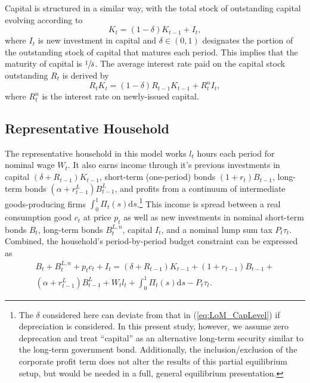 \documentclass[11pt,a4paper,margin=1.5in]{article}
\begin{document}
Capital is structured in a similar way, with the total stock of outstanding capital evolving according to
\begin{equation}
	K_t = (1-\delta)K_{t-1} + I_t,
	\label{eq:LoM_CapLevel}
\end{equation}
where $I_t$ is new investment in capital and $\delta \in (0,1)$ designates the portion of the outstanding stock of capital that matures each period.
This implies that the maturity of capital is $\sfrac{1}{\delta}$. 
The average interest rate paid on the capital stock outstanding $R_t$ is derived by
\begin{equation}
	R_tK_t = (1-\delta)R_{t-1}K_{t-1} + R^n_tI_t,
	\label{eq:LoM_CapReturn}
\end{equation}
where $R^n_t$ is the interest rate on newly-issued capital.

\subsection{Representative Household}
The representative household in this model works $l_t$ hours each period for nominal wage $W_t$.
It also earns income through it's previous investments in capital $(\delta + R_{t-1})K_{t-1}$, short-term (one-period) bonds $(1+r_t)B_{t-1}$, long-term bonds $(\alpha + r^L_{t-1})B^L_{t-1}$, and profits from a continuum of intermediate goods-producing firms $\int^1_0 \Pi_t(s) \mathrm{d}s$.\footnote{
	The $\delta$ considered here can deviate from that in (\ref{eq:LoM_CapLevel}) if depreciation is considered.
	In this present study, however, we assume zero deprecation and treat ``capital'' as an alternative long-term security similar to the long-term government bond.
	Additionally, the inclusion/exclusion of the corporate profit term does not alter the results of this partial equilibrium setup, but would be needed in a full, general equilibrium presentation.}
This income is spread between a real consumption good $c_t$ at price $p_t$ as well as new investments in nominal short-term bonds $B_t$, long-term bonds $B^{L,n}_t$, capital $I_t$, and a nominal lump sum tax $P_t\tau_t$.
Combined, the household's period-by-period budget constraint can be expressed as
\begin{multline}
	B_t + B^{L,n}_t + p_tc_t + I_t = (\delta + R_{t-1})K_{t-1} + (1+r_{t-1})B_{t-1} + \\ (\alpha + r^L_{t-1})B^L_{t-1} + W_tl_t + \int^1_0\Pi_t(s)\text{d}s - P_t\tau_t.
	\label{eq:HH_Budget}
\end{multline}
\end{document}
